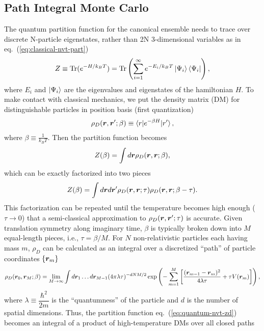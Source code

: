 \subsection{Path Integral Monte Carlo}
The quantum partition function for the canonical ensemble needs to trace over discrete N-particle eigenstates, rather than 2N 3-dimensional variables as in eq.~(\ref{eq:classical-nvt-part})
\begin{align}
Z\equiv \text{Tr}(e^{-H/k_BT})=\text{Tr}\left(
\sum\limits_{i=1}^{\infty} e^{-E_i/k_BT}\ket{\Psi_i}\bra{\Psi_i}
\right),
\end{align}
where $E_i$ and $\ket{\Psi_i}$ are the eigenvalues and eigenstates of the hamiltonian $H$. To make contact with classical mechanics, we put the density matrix (DM) for distinguishable particles in position basis (first quantization)
\begin{align}
\rho_D(\boldsymbol{r}, \boldsymbol{r}'; \beta) \equiv \braket{r|e^{-\beta H}|r'},
\end{align}
where $\beta\equiv \frac{1}{k_B T}$. 
Then the partition function becomes
\begin{align} \label{eq:quantum-nvt-zd}
Z(\beta) = \int d\boldsymbol{r} \rho_D(\boldsymbol{r},\boldsymbol{r};\beta),
\end{align}
which can be exactly factorized into two pieces
\begin{align}
Z(\beta) = \int d\boldsymbol{r}d\boldsymbol{r}' \rho_D(\boldsymbol{r},\boldsymbol{r};\tau)\rho_D(\boldsymbol{r},\boldsymbol{r};\beta-\tau).
\end{align}
This factorization can be repeated until the temperature becomes high enough ($\tau\rightarrow0$) that a semi-classical approximation to $\rho_D(\boldsymbol{r},\boldsymbol{r}';\tau)$ is accurate. Given translation symmetry along imaginary time, $\beta$ is typically broken down into $M$ equal-length pieces, i.e., $\tau=\beta/M$.
For $N$ non-relativistic particles each having mass $m$, $\rho_D$ can be calculated as an integral over a discretized ``path'' of particle coordinates $\{\boldsymbol{r}_m\}$
\begin{align} \label{eq:pimc-rhod}
\rho_D(\boldsymbol{r}_0,\boldsymbol{r}_M;\beta) = \lim\limits_{M\rightarrow\infty} \int d\boldsymbol{r}_1\dots d\boldsymbol{r}_{M-1}
(4\pi\lambda\tau)^{-dNM/2}\exp\left(
-\sum\limits_{m=1}^M \left[
\dfrac{(\boldsymbol{r}_{m-1}-\boldsymbol{r}_m)^2}{4\lambda\tau} + \tau V(\boldsymbol{r}_m)
\right]
\right),
\end{align}
where $\lambda\equiv\dfrac{\hbar^2}{2m}$ is the ``quantumness'' of the particle and $d$ is the number of spatial dimensions. Thus, the partition function eq.~(\ref{eq:quantum-nvt-zd}) becomes an integral of a product of high-temperature DMs over all closed paths
